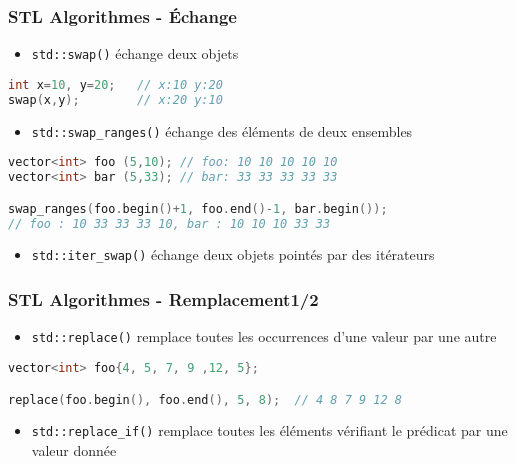 \documentclass[C++.tex]{subfiles}
\begin{document}
\begin{frame}[fragile]
	\frametitle{STL Algorithmes - Échange}
	\begin{itemize}
		\item \lstinline|std::swap()| échange deux objets
	\end{itemize}

	\begin{lstlisting}[language=C++]
int x=10, y=20;   // x:10 y:20
swap(x,y);        // x:20 y:10\end{lstlisting}

	\begin{itemize}
		\item \lstinline|std::swap_ranges()| échange des éléments de deux ensembles
	\end{itemize}

	\begin{lstlisting}[language=C++]
vector<int> foo (5,10); // foo: 10 10 10 10 10
vector<int> bar (5,33); // bar: 33 33 33 33 33

swap_ranges(foo.begin()+1, foo.end()-1, bar.begin());
// foo : 10 33 33 33 10, bar : 10 10 10 33 33\end{lstlisting}

	\begin{itemize}
		\item \lstinline|std::iter_swap()| échange deux objets pointés par des itérateurs
	\end{itemize}
\end{frame}

\begin{frame}[fragile]
	\frametitle{STL Algorithmes - Remplacement\titlehfill{}1/2}
	\begin{itemize}
		\item \lstinline|std::replace()| remplace toutes les occurrences d'une valeur par une autre
	\end{itemize}

	\begin{lstlisting}[language=C++]
vector<int> foo{4, 5, 7, 9 ,12, 5};

replace(foo.begin(), foo.end(), 5, 8);  // 4 8 7 9 12 8\end{lstlisting}

	\begin{itemize}
		\item \lstinline|std::replace_if()| remplace toutes les éléments vérifiant le prédicat par une valeur donnée
	\end{itemize}
\end{frame}
\end{document}
